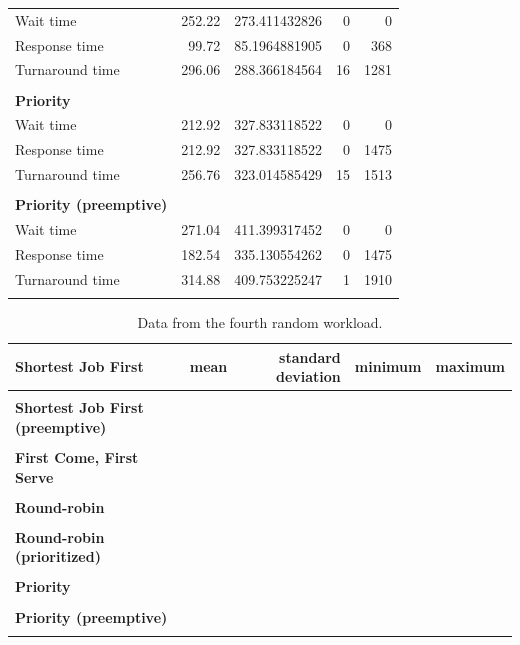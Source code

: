 \documentclass[12pt,letterpaper]{article}
\begin{document}
\begin{appendices}
\begin{table}[H]
\begin{tabular}{l r r r r}
					\hline
Wait time &		252.22 &	273.411432826 &	0 &	0 	\\
Response time &		99.72 &	85.1964881905 &	0 &	368 	\\
Turnaround time &	296.06 &	288.366184564 &	16 &	1281 	\\
					\\
					\textbf{Priority} \\
					\hline
Wait time &		212.92 &	327.833118522 &	0 &	0 	\\
Response time &		212.92 &	327.833118522 &	0 &	1475 	\\
Turnaround time &	256.76 &	323.014585429 &	15 &	1513 	\\
					\\
					\textbf{Priority (preemptive)} \\
					\hline
Wait time &		271.04 &	411.399317452 &	0 &	0 	\\
Response time &		182.54 &	335.130554262 &	0 &	1475 	\\
Turnaround time &	314.88 &	409.753225247 &	1 &	1910 	\\
					\\
				\end{tabular}
			\end{table}

			\begin{table}[H]
	 			\label{table:data-rand4}
	  			\caption{Data from the fourth random workload.}
		  		\begin{tabular}{l r r r r}
					\textbf{Shortest Job First} & mean & standard deviation & minimum & maximum\\
					\hline
					\\
					\textbf{Shortest Job First (preemptive)} \\
					\hline
					\\
					\textbf{First Come, First Serve} \\
					\hline
					\\
					\textbf{Round-robin} \\
					\hline
					\\
					\textbf{Round-robin (prioritized)} \\
					\hline
					\\
					\textbf{Priority} \\
					\hline
					\\
					\textbf{Priority (preemptive)} \\
					\hline
					\\
				\end{tabular}
			\end{table}


\end{appendices}
\end{document}
